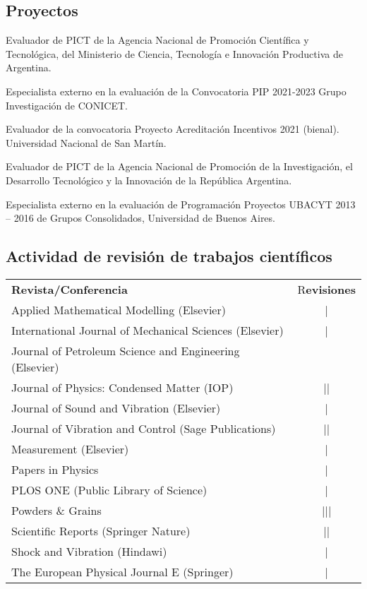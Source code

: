 \subsection{Proyectos}

 Evaluador de PICT de la Agencia Nacional de Promoción Científica y Tecnológica, del Ministerio de Ciencia, Tecnología e 
Innovación Productiva de Argentina.

 Especialista externo en la evaluación de la Convocatoria PIP 2021-2023 Grupo Investigación de CONICET.

 Evaluador de la convocatoria Proyecto Acreditación Incentivos 2021 (bienal). Universidad Nacional de San Martín.

 Evaluador de PICT de la Agencia Nacional de Promoción de la Investigación, el Desarrollo Tecnológico y la Innovación de la República Argentina.

 Especialista externo en la evaluación de Programación Proyectos UBACYT 2013 -- 2016 de Grupos Consolidados, Universidad de Buenos Aires.

\subsection{Actividad de revisión de trabajos científicos}
\begin{tabular}{l c}
    \textbf{Revista/Conferencia} & R\textbf{evisiones} \\
    Applied Mathematical Modelling (Elsevier) & | \\ 
    International Journal of Mechanical Sciences (Elsevier) & | \\
    Journal of Petroleum Science and Engineering (Elsevier) & \cancel{||||} \\
    Journal of Physics: Condensed Matter (IOP) & || \\
    Journal of Sound and Vibration (Elsevier) & \cancel{||||} | \\
    Journal of Vibration and Control (Sage Publications) & || \\
    Measurement (Elsevier) &  | \\
    Papers in Physics & | \\
    PLOS ONE (Public Library of Science) & | \\
    Powders \& Grains & ||| \\
    Scientific Reports (Springer Nature) & || \\
    Shock and Vibration (Hindawi) &  | \\
    The European Physical Journal E (Springer) & | 
\end{tabular}

